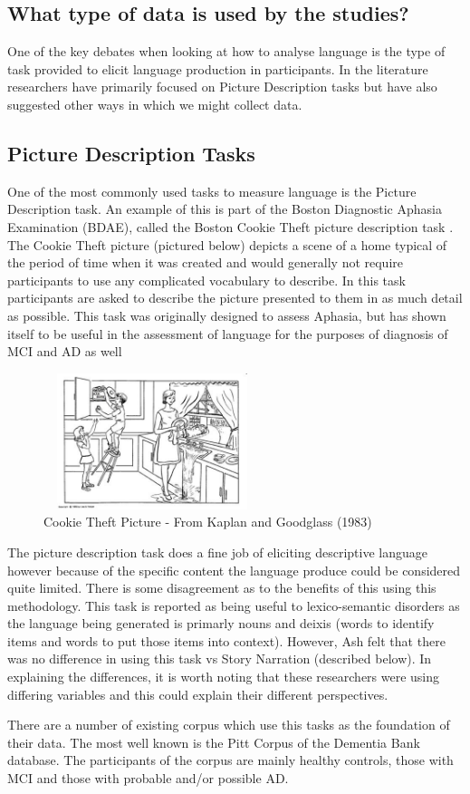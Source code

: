 \documentclass[10pt, letterpaper, twoside, openany]{thesis}
\begin{document}
\subsection{What type of data is used by the studies?}
One of the key debates when looking at how to analyse language is the type of task provided to elicit language production in participants. In the literature researchers have primarily focused on Picture Description tasks but have also suggested other ways in which we might collect data.
\par
\subsection{Picture Description Tasks}
One of the most commonly used tasks to measure language is the Picture Description task. An example of this is part of the Boston Diagnostic Aphasia Examination (BDAE), called the Boston Cookie Theft picture description task \cite{Borod1980}. The Cookie Theft picture (pictured below) depicts a scene of a home typical of the period of time when it was created and would generally not require participants to use any complicated vocabulary to describe. In this task participants are asked to describe the picture presented to them in as much detail as possible.  This task was originally designed to assess Aphasia, but has shown itself to be useful in the assessment of language for the purposes of diagnosis of MCI and AD as well \cite{Giles1996}
\begin{figure}[H]
\centering
\includegraphics[width=240px, height=150px]{images/BCTPicture.png}
\caption{Cookie Theft Picture - From Kaplan and Goodglass (1983)}
\end{figure}
\par
The picture description task does a fine job of eliciting descriptive language however because of the specific content the language produce could be considered quite limited. There is some disagreement as to the benefits of this using this methodology. This task is reported as being useful to lexico-semantic disorders \cite{Boschi2017, Sajjadi2012} as the language being generated is primarly nouns and deixis (words to identify items and words to put those items into context). However, Ash \cite{Ash2012}felt that there was no difference in using this task vs Story Narration (described below). In explaining the differences, it is worth noting that these researchers were using differing variables and this could explain their different perspectives.
\par 
There are a number of existing corpus which use this tasks as the foundation of their data. The most well known is the Pitt Corpus of the Dementia Bank database. The participants of the corpus are mainly healthy controls, those with MCI and those with probable and/or possible AD. 
\end{document}
